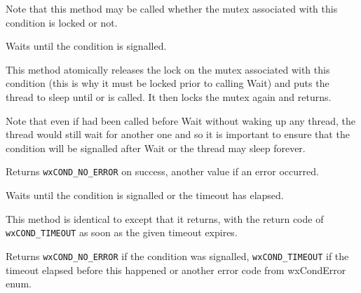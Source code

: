 Note that this method may be called whether the mutex associated with this
condition is locked or not.



\label{wxconditionwait}


Waits until the condition is signalled.

This method atomically releases the lock on the mutex associated with this
condition (this is why it must be locked prior to calling Wait) and puts the
thread to sleep until  or 
 is called. It then locks the mutex
again and returns.

Note that even if  had been called before
Wait without waking up any thread, the thread would still wait for another one
and so it is important to ensure that the condition will be signalled after
Wait or the thread may sleep forever.


Returns {\tt wxCOND\_NO\_ERROR} on success, another value if an error occurred.




\label{wxconditionwaittimeout}


Waits until the condition is signalled or the timeout has elapsed.

This method is identical to  except that it
returns, with the return code of {\tt wxCOND\_TIMEOUT} as soon as the given
timeout expires.




Returns {\tt wxCOND\_NO\_ERROR} if the condition was signalled, 
{\tt wxCOND\_TIMEOUT} if the timeout elapsed before this happened or another
error code from wxCondError enum.

